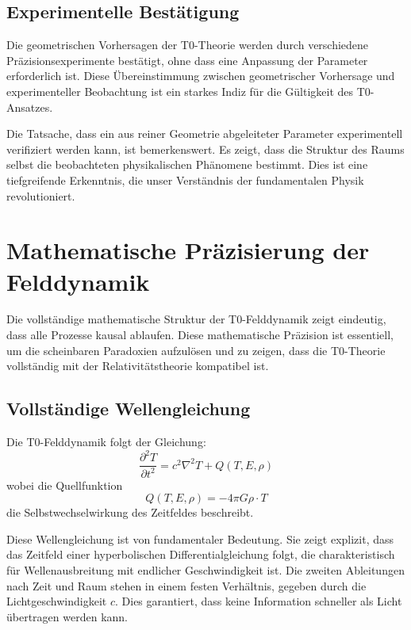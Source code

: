 \documentclass[12pt,a4paper]{article}
\begin{document}
	\subsection{Experimentelle Bestätigung}
	
	Die geometrischen Vorhersagen der T0-Theorie werden durch verschiedene Präzisionsexperimente bestätigt, ohne dass eine Anpassung der Parameter erforderlich ist. Diese Übereinstimmung zwischen geometrischer Vorhersage und experimenteller Beobachtung ist ein starkes Indiz für die Gültigkeit des T0-Ansatzes.
	
	Die Tatsache, dass ein aus reiner Geometrie abgeleiteter Parameter experimentell verifiziert werden kann, ist bemerkenswert. Es zeigt, dass die Struktur des Raums selbst die beobachteten physikalischen Phänomene bestimmt. Dies ist eine tiefgreifende Erkenntnis, die unser Verständnis der fundamentalen Physik revolutioniert.
	
	\section{Mathematische Präzisierung der Felddynamik}
	
	Die vollständige mathematische Struktur der T0-Felddynamik zeigt eindeutig, dass alle Prozesse kausal ablaufen. Diese mathematische Präzision ist essentiell, um die scheinbaren Paradoxien aufzulösen und zu zeigen, dass die T0-Theorie vollständig mit der Relativitätstheorie kompatibel ist.
	
	\subsection{Vollständige Wellengleichung}
	
	Die T0-Felddynamik folgt der Gleichung:
	\begin{equation}
		\frac{\partial^2 T}{\partial t^2} = c^2\nabla^2 T + Q(T, E, \rho) \label{eq:wave_equation}
	\end{equation}
	wobei die Quellfunktion
	\begin{equation}
		Q(T, E, \rho) = -4\pi G \rho \cdot T
	\end{equation}
	die Selbstwechselwirkung des Zeitfeldes beschreibt.
	
	Diese Wellengleichung ist von fundamentaler Bedeutung. Sie zeigt explizit, dass das Zeitfeld einer hyperbolischen Differentialgleichung folgt, die charakteristisch für Wellenausbreitung mit endlicher Geschwindigkeit ist. Die zweiten Ableitungen nach Zeit und Raum stehen in einem festen Verhältnis, gegeben durch die Lichtgeschwindigkeit $c$. Dies garantiert, dass keine Information schneller als Licht übertragen werden kann.
	
\end{document}
